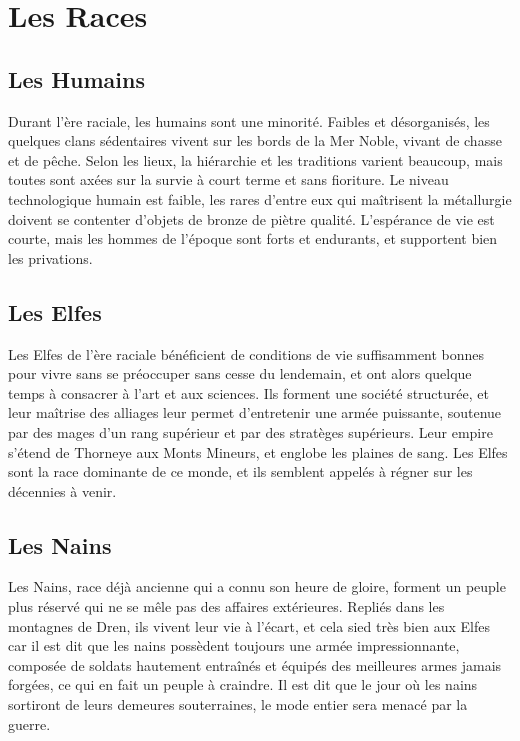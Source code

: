 \chapter{Les Races}
\section{Les Humains}
Durant l'ère raciale, les humains sont une minorité. Faibles et désorganisés, les quelques clans sédentaires vivent sur les bords de la Mer Noble, vivant de chasse et de pêche. Selon les lieux, la hiérarchie et les traditions varient beaucoup, mais toutes sont axées sur la survie à court terme et sans fioriture. Le niveau technologique humain est faible, les rares d'entre eux qui maîtrisent la métallurgie doivent se contenter d'objets de bronze de piètre qualité. L'espérance de vie est courte, mais les hommes de l'époque sont forts et endurants, et supportent bien les privations.

\section{Les Elfes}
Les Elfes de l'ère raciale bénéficient de conditions de vie suffisamment bonnes pour vivre sans se préoccuper sans cesse du lendemain, et ont alors quelque temps à consacrer à l'art et aux sciences. Ils forment une société structurée, et leur maîtrise des alliages leur permet d'entretenir une armée puissante, soutenue par des mages d'un rang supérieur et par des stratèges supérieurs. Leur empire s'étend de Thorneye aux Monts Mineurs, et englobe les plaines de sang. Les Elfes sont la race dominante de ce monde, et ils semblent appelés à régner sur les décennies à venir.

\section{Les Nains}
Les Nains, race déjà ancienne qui a connu son heure de gloire, forment un peuple plus réservé qui ne se mêle pas des affaires extérieures. Repliés dans les montagnes de Dren, ils vivent leur vie à l'écart, et cela sied très bien aux Elfes car il est dit que les nains possèdent toujours une armée impressionnante, composée de soldats hautement entraînés et équipés des meilleures armes jamais forgées, ce qui en fait un peuple à craindre. Il est dit que le jour où les nains sortiront de leurs demeures souterraines, le mode entier sera menacé par la guerre.


